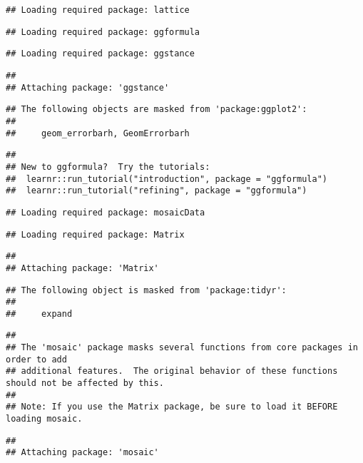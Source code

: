 \documentclass[]{tufte-handout}
\begin{document}
\begin{verbatim}
## Loading required package: lattice
\end{verbatim}

\begin{verbatim}
## Loading required package: ggformula
\end{verbatim}

\begin{verbatim}
## Loading required package: ggstance
\end{verbatim}

\begin{verbatim}
## 
## Attaching package: 'ggstance'
\end{verbatim}

\begin{verbatim}
## The following objects are masked from 'package:ggplot2':
## 
##     geom_errorbarh, GeomErrorbarh
\end{verbatim}

\begin{verbatim}
## 
## New to ggformula?  Try the tutorials: 
##  learnr::run_tutorial("introduction", package = "ggformula")
##  learnr::run_tutorial("refining", package = "ggformula")
\end{verbatim}

\begin{verbatim}
## Loading required package: mosaicData
\end{verbatim}

\begin{verbatim}
## Loading required package: Matrix
\end{verbatim}

\begin{verbatim}
## 
## Attaching package: 'Matrix'
\end{verbatim}

\begin{verbatim}
## The following object is masked from 'package:tidyr':
## 
##     expand
\end{verbatim}

\begin{verbatim}
## 
## The 'mosaic' package masks several functions from core packages in order to add 
## additional features.  The original behavior of these functions should not be affected by this.
## 
## Note: If you use the Matrix package, be sure to load it BEFORE loading mosaic.
\end{verbatim}

\begin{verbatim}
## 
## Attaching package: 'mosaic'
\end{verbatim}
\end{document}
